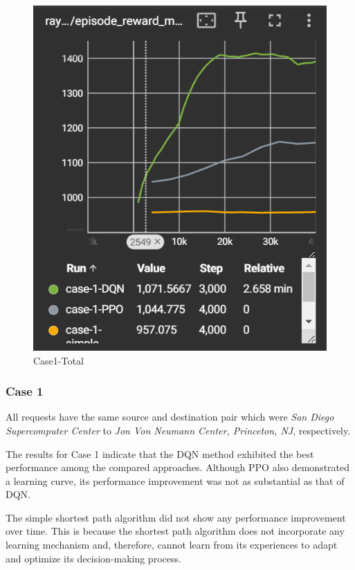 \documentclass[conference]{IEEEtran}
\begin{document}
\begin{figure}[h]
    \centering
    \includegraphics[width=0.75\linewidth]{all1.png}
    \caption{Case1-Total}
    \label{fig:enter-label}
\end{figure}

\subsubsection{Case 1}
All requests have the same source and destination pair which were \textit{San Diego Supercomputer Center} to \textit{Jon Von Neumann Center, Princeton, NJ}, respectively.


The results for Case 1 indicate that the DQN method exhibited the best performance among the compared approaches. Although PPO also demonstrated a learning curve, its performance improvement was not as substantial as that of DQN. 

The simple shortest path algorithm did not show any performance improvement over time. This is because the shortest path algorithm does not incorporate any learning mechanism and, therefore, cannot learn from its experiences to adapt and optimize its decision-making process.
\end{document}
